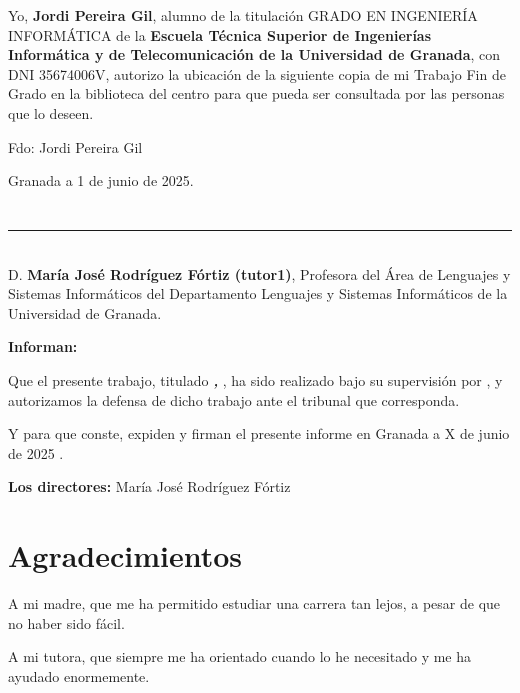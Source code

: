 Yo, \textbf{Jordi Pereira Gil}, alumno de la titulación GRADO EN INGENIERÍA INFORMÁTICA de la \textbf{Escuela Técnica Superior
de Ingenierías Informática y de Telecomunicación de la Universidad de Granada}, con DNI 35674006V, autorizo la
ubicación de la siguiente copia de mi Trabajo Fin de Grado en la biblioteca del centro para que pueda ser
consultada por las personas que lo deseen.

\vspace{6cm}

\noindent Fdo: Jordi Pereira Gil

\vspace{2cm}

\begin{flushright}
Granada a 1 de junio de 2025.
\end{flushright}


\chapter*{}
\thispagestyle{empty}

\noindent\rule[-1ex]{\textwidth}{2pt}\\[4.5ex]

D. \textbf{	María José Rodríguez Fórtiz (tutor1)}, Profesora del Área de Lenguajes y Sistemas Informáticos del Departamento Lenguajes y Sistemas Informáticos de la Universidad de Granada.

\vspace{0.5cm}


\vspace{0.5cm}

\textbf{Informan:}

\vspace{0.5cm}

Que el presente trabajo, titulado \textit{\textbf{\myTitle, \mySubTitle}},
ha sido realizado bajo su supervisión por \textbf{\myName}, y autorizamos la defensa de dicho trabajo ante el tribunal
que corresponda.

\vspace{0.5cm}

Y para que conste, expiden y firman el presente informe en Granada a X de junio de 2025 .

\vspace{1cm}

\textbf{Los directores:} 
	María José Rodríguez Fórtiz

\vspace{5cm}

\noindent \textbf{\myProf}

\chapter*{Agradecimientos}
\thispagestyle{empty}

       \vspace{1cm}


A mi madre, que me ha permitido estudiar una carrera tan lejos, a pesar de que no haber sido fácil.

A mi tutora, que siempre me ha orientado cuando lo he necesitado y me ha ayudado enormemente.


